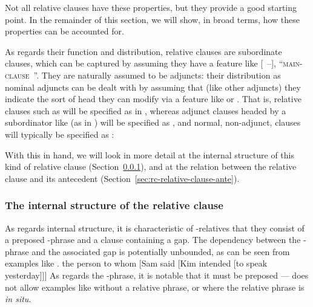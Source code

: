 \documentclass[output=paper,biblatex,babelshorthands,newtxmath,draftmode,colorlinks,citecolor=brown]{langscibook}
\begin{document}
Not all relative clauses have these properties, but they provide a good starting point.
In the remainder of this section, we will show, in broad terms, how these properties can
be accounted for.

As regards their function and distribution, relative clauses are subordinate clauses,
which can be captured by assuming they have a  feature like [~{--}],
``\textsc{main-clause}~''. They are naturally assumed to be adjuncts: their
distribution as nominal adjuncts can be dealt with by assuming that (like other adjuncts)
they indicate the sort of head they can modify via a feature like  or
. %
That is,
relative clauses such as  will be specified as in , whereas
adjunct clauses headed by a subordinator like  (as in ) will be specified as , and normal, non-adjunct, clauses will
typically be specified as :
\begin{exe}\ex\begin{xlist}
  \ex\label{x:rc-5}
  \ex\label{x:rc-6}
 \ex\label{x:rc-7}
\end{xlist}
\end{exe}

With this in hand, we will look in more detail at the internal structure of this kind of
relative clause (Section~\ref{sec:rc-intern-struct-relat}), and at the relation between
the relative clause and its antecedent (Section~\ref{sec:rc-relative-clause-ante}).

\subsubsection{The internal structure of the relative clause}
\label{sec:rc-intern-struct-relat}\label{rc:sec-internal-structure}

As regards internal structure, it is characteristic of -relatives that
they consist of a preposed -phrase and a clause containing a gap.
The dependency between the -phrase and the associated gap is potentially
unbounded, as can be seen from examples like .
\ea
\label{x:rc-11}
the person to whom [Sam said [Kim intended [to speak \trace{} yesterday]]]
\z
As regards the -phrase, it is notable that it must be preposed --- 
does not allow examples like  without a relative phrase, or  where
the relative phrase is \emph{in situ}.
\end{document}
